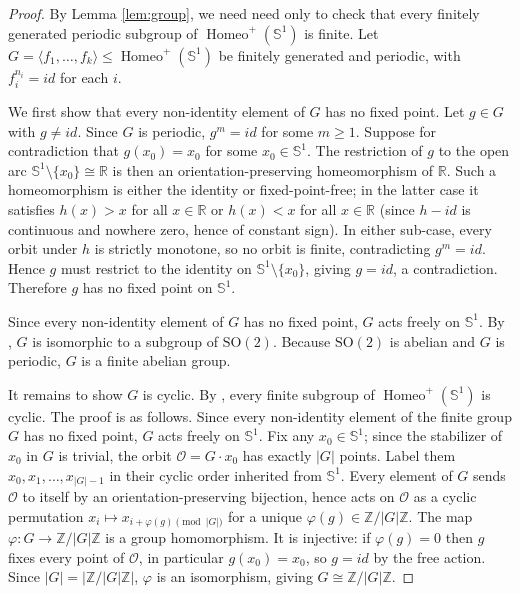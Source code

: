 \documentclass[12pt,a4paper]{amsart}
\numberwithin{equation}{section}
\DeclareMathOperator{\Homeo}{Homeo}
\theoremstyle{plain}
\theoremstyle{definition}
\theoremstyle{remark}
\begin{document}
\begin{proof}
By Lemma \ref{lem:group}, we need need only to check that every finitely generated periodic subgroup of $\Homeo^+(\mathbb{S}^1)$ is finite.
Let $G = \langle f_1, \ldots, f_k \rangle \leq
\Homeo^+(\mathbb{S}^1)$ be finitely generated and periodic, with $f_i^{n_i} = id$ for each $i$.

We first show that every non-identity element of $G$ has no fixed point.
Let $g \in G$ with $g \neq id$. Since $G$ is periodic, $g^m = id$ for some $m \geq 1$.
Suppose for contradiction that $g(x_0) = x_0$ for some $x_0 \in \mathbb{S}^1$.
The restriction of $g$ to the open arc $\mathbb{S}^1 \setminus \{x_0\} \cong \mathbb{R}$ is then an orientation-preserving homeomorphism of $\mathbb{R}$.
Such a homeomorphism is either the identity or fixed-point-free; in the latter case it satisfies $h(x) > x$ for all $x \in \mathbb{R}$ or $h(x) < x$ for all $x \in \mathbb{R}$ (since $h - id$ is continuous and nowhere zero, hence of constant sign).
In either sub-case, every orbit under $h$ is strictly monotone, so no orbit is finite, contradicting $g^m = id$.
Hence $g$ must restrict to the identity on $\mathbb{S}^1 \setminus \{x_0\}$, giving $g = id$, a contradiction.
Therefore $g$ has no fixed point on $\mathbb{S}^1$.

Since every non-identity element of $G$ has no fixed point, $G$ acts
freely on $\mathbb{S}^1$. By \cite[Theorem 2.2.32]{MR2809110}, $G$ is isomorphic to a subgroup of $\mathrm{SO}(2)$.
Because $\mathrm{SO}(2)$ is abelian and $G$ is periodic, $G$ is a finite abelian group.

It remains to show $G$ is cyclic. By \cite[Lemma~3.1]{MR3813208}, every finite subgroup of $\Homeo^+(\mathbb{S}^1)$ is cyclic.
The proof is as follows. Since every non-identity element of the finite group $G$ has no fixed point, $G$ acts freely on $\mathbb{S}^1$.
Fix any $x_0 \in \mathbb{S}^1$; since the stabilizer of $x_0$ in $G$ is trivial, the orbit $\mathcal{O} = G \cdot x_0$ has exactly $|G|$ points.
Label them $x_0, x_1, \ldots, x_{|G|-1}$ in their cyclic order inherited from $\mathbb{S}^1$.
Every element of $G$ sends $\mathcal{O}$ to itself by an orientation-preserving bijection, hence acts on $\mathcal{O}$ as a cyclic permutation $x_i \mapsto x_{i+\varphi(g) \pmod{|G|}}$ for a unique $\varphi(g) \in \mathbb{Z}/|G|\mathbb{Z}$.
The map $\varphi \colon G \to \mathbb{Z}/|G|\mathbb{Z}$ is a group homomorphism.
It is injective: if $\varphi(g) = 0$ then $g$ fixes every point of $\mathcal{O}$, in particular $g(x_0) = x_0$, so $g = id$ by the free action.
Since $|G| = |\mathbb{Z}/|G|\mathbb{Z}|$, $\varphi$ is an isomorphism, giving $G \cong \mathbb{Z}/|G|\mathbb{Z}$.
\end{proof}
\end{document}
